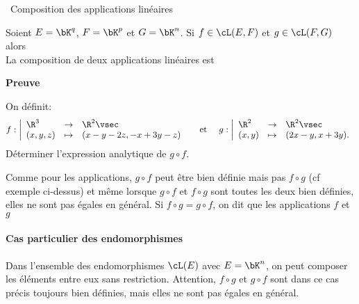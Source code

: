 \documentclass[a4paper, 11pt]{article}
\begin{document}
\vspace{0.4cm}

\noindent\ {Composition des applications lin\'eaires}\\

 {\noindent  

\begin{prop}
Soient $E=\bK^q$, $F=\bK^p$ et $G=\bK^n$. Si $f\in\cL(E,F)$ et $g\in\cL(F,G)$ alors \dotfill\vsec\\
\noindent La composition de deux applications lin\'eaires est \dotfill\vsec
\end{prop}
 }

\textbf{Preuve}

\vspace{5cm}

{\footnotesize \begin{exercice} On d\'efinit:
$$f: \left|\begin{array}{lllllllll}
 \R^3 & \rightarrow & \R^2 \vsec\\
 (x,y,z) & \mapsto &(x-y-2z,-x+3y-z)
\end{array}\right. \quad \textmd{ et } \quad
g: \left|\begin{array}{lllllllll}
 \R^2 & \rightarrow & \R^2\vsec\\
(x,y) & \mapsto & (2x-y, x+3y).
\end{array}\right.
$$ 
D\'eterminer l'expression analytique de $g\circ f$. 
\end{exercice}
}

\noindent \warning  Comme pour les applications, $g\circ f$ peut \^etre bien d\'efinie mais pas $f\circ g$ (cf exemple ci-dessus) et m\^eme lorsque $g\circ f$ et $f\circ g$ sont toutes les deux bien d\'efinies, elles ne sont pas \'egales en g\'en\'eral. Si $f\circ g=g\circ f$, on dit que les applications $f$ et $g$ \dotfill\phantom{\hspace{10cm}}

\vspace{0.4cm}

\paragraph{Cas particulier des endomorphismes}

\noindent Dans l'ensemble des endomorphismes $\cL(E)$ avec $E=\bK^n$, on peut composer les \'el\'ements entre eux sans restriction. Attention, $f\circ g$ et $g\circ f$ sont dans ce cas pr\'ecis toujours bien d\'efinies, mais elles ne sont pas \'egales en g\'en\'eral.\\
\end{document}
